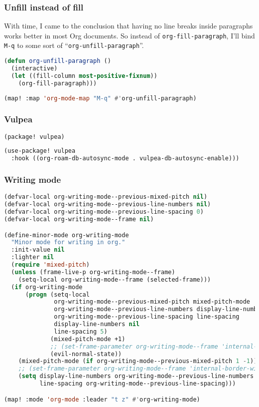 \documentclass[11pt]{article}
\begin{document}
\subsubsection{Unfill instead of fill}
\label{sec:unfill-instead-of-fill}
With time, I came to the conclusion that having no line breaks inside paragraphs works better in most Org documents. So instead of \lstinline|org-fill-paragraph|, I’ll bind \texttt{M-q} to some sort of ``\lstinline|org-unfill-paragraph|''.

\begin{lstlisting}[language=Lisp]
(defun org-unfill-paragraph ()
  (interactive)
  (let ((fill-column most-positive-fixnum))
    (org-fill-paragraph)))
 
(map! :map 'org-mode-map "M-q" #'org-unfill-paragraph)
\end{lstlisting}

\subsubsection{Vulpea}
\label{sec:vulpea}
\begin{lstlisting}[language=Lisp]
(package! vulpea)
\end{lstlisting}

\begin{lstlisting}[language=Lisp]
(use-package! vulpea
  :hook ((org-roam-db-autosync-mode . vulpea-db-autosync-enable)))
\end{lstlisting}

\subsubsection{Writing mode}
\label{sec:writing-mode}
\begin{lstlisting}[language=Lisp]
(defvar-local org-writing-mode--previous-mixed-pitch nil)
(defvar-local org-writing-mode--previous-line-numbers nil)
(defvar-local org-writing-mode--previous-line-spacing 0)
(defvar-local org-writing-mode--frame nil)

(define-minor-mode org-writing-mode
  "Minor mode for writing in org."
  :init-value nil
  :lighter nil
  (require 'mixed-pitch)
  (unless (frame-live-p org-writing-mode--frame)
    (setq-local org-writing-mode--frame (selected-frame)))
  (if org-writing-mode
      (progn (setq-local
              org-writing-mode--previous-mixed-pitch mixed-pitch-mode
              org-writing-mode--previous-line-numbers display-line-numbers
              org-writing-mode--previous-line-spacing line-spacing
              display-line-numbers nil
              line-spacing 5)
             (mixed-pitch-mode +1)
             ;; (set-frame-parameter org-writing-mode--frame 'internal-border-width 30)
             (evil-normal-state))
    (mixed-pitch-mode (if org-writing-mode--previous-mixed-pitch 1 -1))
    ;; (set-frame-parameter org-writing-mode--frame 'internal-border-width 0)
    (setq display-line-numbers org-writing-mode--previous-line-numbers
          line-spacing org-writing-mode--previous-line-spacing)))

(map! :mode 'org-mode :leader "t z" #'org-writing-mode)
\end{lstlisting}
\end{document}
